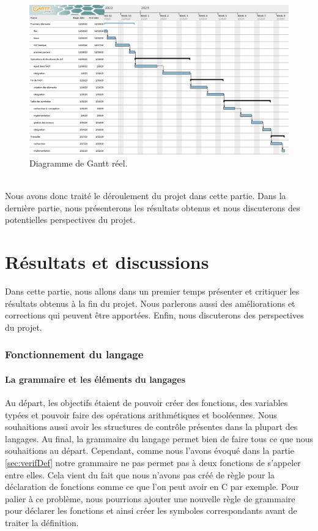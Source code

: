 \documentclass[a4paper]{article}%
\begin{document}
\begin{figure}[h!]
  \begin{center}
  \includegraphics[scale=0.35]{./img/real-project.png}
  \caption{Diagramme de Gantt réel.}
  \end{center}
\end{figure}~\\

Nous avons donc traité le déroulement du projet dans cette partie. Dans la
dernière partie, nous présenterons les résultats obtenus et nous discuterons des
potentielles perspectives du projet.

\clearpage
\part{Résultats et discussions}

Dans cette partie, nous allons dans un premier temps présenter et critiquer les
résultats obtenus à la fin du projet. Nous parlerons aussi des améliorations et
corrections qui peuvent être apportées. Enfin, nous discuterons des perspectives
du projet.

\section{Fonctionnement du langage}

\subsection{La grammaire et les éléments du langages}

Au départ, les objectifs étaient de pouvoir créer des fonctions, des variables
typées et pouvoir faire des opérations arithmétiques et booléennes. Nous
souhaitions aussi avoir les structures de contrôle présentes dans la plupart des
langages. Au final, la grammaire du langage permet bien de faire tous ce que
nous souhaitions au départ. Cependant, comme nous l'avons évoqué dans la partie
\ref{sec:verifDef} notre grammaire ne pas permet pas à deux fonctions de
s'appeler entre elles. Cela vient du fait que nous n'avons pas créé de règle
pour la déclaration de fonctions comme ce que l'on peut avoir en C par exemple.
Pour palier à ce problème, nous pourrions ajouter une nouvelle règle de
grammaire pour déclarer les fonctions et ainsi créer les symboles correspondants
avant de traiter la définition.\\
\end{document}

